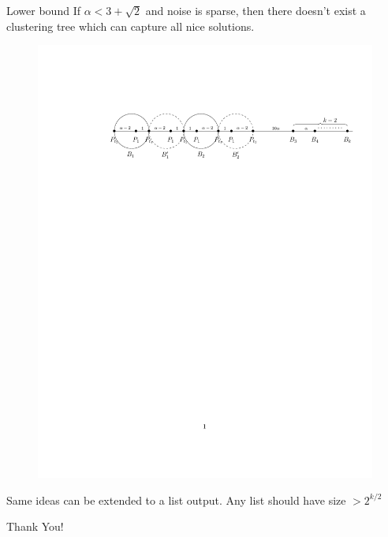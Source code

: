 \documentclass{beamer}
\begin{document}
\begin{frame}{Lower bound}
	If $\alpha < 3 + \sqrt{2}$ and noise is sparse, then there doesn't exist a clustering tree which can capture all nice solutions.
	\begin{figure}[!t]
	  \begin{center}
	    \includegraphics[trim={47mm 205mm 12mm 44mm},clip,width=\textwidth]{lbdFig2.pdf}
	  \end{center}
	\end{figure}
	Same ideas can be extended to a list output. Any list should have size $> 2^{k/2}$
\end{frame}

\begin{frame}
    \Huge{\centerline{Thank You!}}
\end{frame}



\appendix
\end{document}

